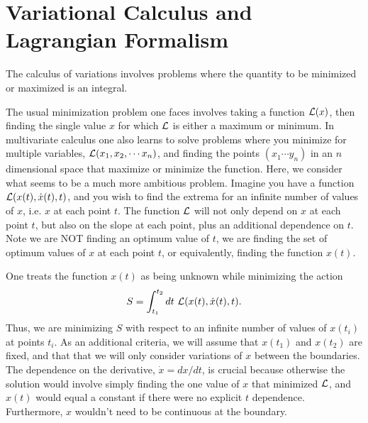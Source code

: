 \documentclass[letterpaper,10pt,english]{sphinxmanual}
\begin{document}
\chapter{Variational Calculus and Lagrangian Formalism}
\label{\detokenize{chapter1:variational-calculus-and-lagrangian-formalism}}
The calculus of variations involves
problems where the quantity to be minimized or maximized is an integral.

The usual minimization problem one faces involves taking a function
\({\cal L}(x)\), then finding the single value \(x\) for which \({\cal L}\)
is either a maximum or minimum. In multivariate calculus one also
learns to solve problems where you minimize for multiple variables,
\({\cal L}(x_1,x_2,\cdots x_n)\), and finding the points \((x_1\cdots
y_n)\) in an \(n\)\sphinxhyphen{}dimensional space that maximize or minimize the
function. Here, we consider what seems to be a much more ambitious
problem. Imagine you have a function \({\cal L}(x(t),\dot{x}(t),t)\),
and you wish to find the extrema for an infinite number of values of
\(x\), i.e. \(x\) at each point \(t\). The function \({\cal L}\) will not only
depend on \(x\) at each point \(t\), but also on the slope at each point,
plus an additional dependence on \(t\). Note we are NOT finding an
optimum value of \(t\), we are finding the set of optimum values of \(x\)
at each point \(t\), or equivalently, finding the function \(x(t)\).

One treats the function \(x(t)\) as being unknown while minimizing the action
\begin{equation*}
\begin{split}
S=\int_{t_1}^{t_2}dt~{\cal L}(x(t),\dot{x}(t),t).
\end{split}
\end{equation*}
Thus, we are minimizing \(S\) with respect to an infinite number of
values of \(x(t_i)\) at points \(t_i\). As an additional criteria, we will
assume that \(x(t_1)\) and \(x(t_2)\) are fixed, and that that we will
only consider variations of \(x\) between the boundaries. The dependence
on the derivative, \(\dot{x}=dx/dt\), is crucial because otherwise the
solution would involve simply finding the one value of \(x\) that
minimized \({\cal L}\), and \(x(t)\) would equal a constant if there were no
explicit \(t\) dependence. Furthermore, \(x\) wouldn’t need to be
continuous at the boundary.
\end{document}

